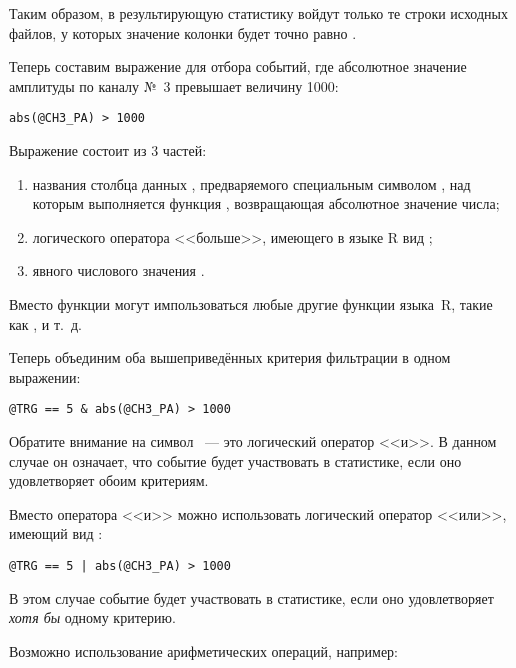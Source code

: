 Таким образом, в результирующую статистику войдут только те строки исходных файлов, у которых значение колонки  будет точно равно .

\bigskip

Теперь составим выражение для отбора событий, где абсолютное значение амплитуды по каналу №~3 превышает величину 1000:

\begin{lstlisting}
abs(@CH3_PA) > 1000
\end{lstlisting}

Выражение состоит из 3 частей:

\begin{enumerate}
\item названия столбца данных , предваряемого специальным символом , над которым выполняется функция , возвращающая абсолютное значение числа;
\item логического оператора <<больше>>, имеющего в языке R вид \CMDARG{>};
\item явного числового значения .
\end{enumerate}

Вместо функции  могут импользоваться любые другие функции языка~R, такие как ,  и т.~д.

\bigskip

Теперь объединим оба вышеприведённых критерия фильтрации в одном выражении:

\begin{lstlisting}
@TRG == 5 & abs(@CH3_PA) > 1000
\end{lstlisting}

Обратите внимание на символ \CMDARG{\&}~--- это логический оператор <<и>>. В данном случае он означает, что событие будет участвовать в статистике, если оно удовлетворяет обоим критериям.

Вместо оператора <<и>> можно использовать логический оператор <<или>>, имеющий вид \CMDARG{|}:

\begin{lstlisting}
@TRG == 5 | abs(@CH3_PA) > 1000
\end{lstlisting}

В этом случае событие будет участвовать в статистике, если оно удовлетворяет {\it хотя бы} одному критерию.

\bigskip

Возможно использование арифметических операций, например:

